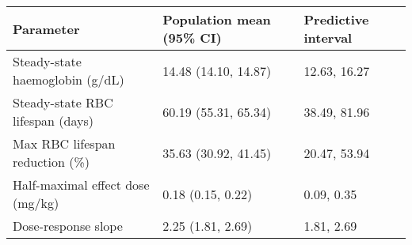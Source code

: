 
\begin{tabular}{lll}
\toprule
Parameter & Population mean (95\% CI) & Predictive interval\\
\midrule
Steady-state haemoglobin (g/dL) & 14.48 (14.10, 14.87) & 12.63, 16.27\\
Steady-state RBC lifespan (days) & 60.19 (55.31, 65.34) & 38.49, 81.96\\
Max RBC lifespan reduction (\%) & 35.63 (30.92, 41.45) & 20.47, 53.94\\
Half-maximal effect dose (mg/kg) & 0.18 (0.15, 0.22) & 0.09, 0.35\\
Dose-response slope & 2.25 (1.81, 2.69) & 1.81, 2.69\\
\bottomrule
\end{tabular}